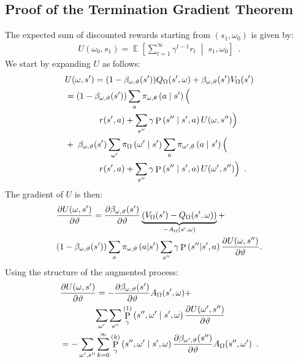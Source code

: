 \documentclass[letterpaper]{article}
\def\given{\;\middle\vert\;}
\DeclareMathOperator*{\expectation}{\mathbb{E}}
\DeclareMathOperator{\prob}{P}
\def\options{\Omega}
\def\option{\omega}
\def\termparams{\vartheta}
\begin{document}
\subsection*{Proof of the Termination Gradient Theorem}
The expected sum of discounted rewards starting from $(s_1, \omega_0)$ is given by:
\begin{align*}
U(\omega_0, s_1) = \expectation\left[ \sum_{t=1}^\infty \gamma^{t-1} r_{t}  \given s_1, \omega_0 \right] \enspace .
\end{align*}
We start by expanding $U$ as follows:
\begin{align}
&U( \option, s') = (1 - \beta_{\option, \termparams}(s'))Q_\Omega(s', \omega) + \beta_{\option, \termparams}(s')V_\Omega(s') \notag\\
&=(1 - \beta_{\option, \termparams}(s')) \sum_{a} \pi_{\option,\theta}\left(a \given s'\right) \Big(\notag \\
&\hspace{4em}r(s', a) + \sum_{s''} \gamma \prob\left(s'' \given s', a \right)U(\option, s'')\Big) \notag \\
&+ \;\beta_{\option, \termparams}(s') \sum_{\option'}\pi_{\Omega}\left( \option' \given s'\right)\sum_a \pi_{\option',\theta}\left(a \given s' \right)\Big( \notag \\
&\hspace{4em} r(s', a) + \sum_{s''} \gamma  \prob\left(s'' \given s', a\right) U(\option', s'')\Big)\notag \enspace .
\end{align}
The gradient of $U$ is then:
\begin{align*}
&\deriv[U(\option, s')]{\termparams} = \deriv[\beta_{\option, \termparams}(s')]{\termparams}\underbrace{\left(V_\options(s') - Q_\options(s', \option)\right)}_{-A_\options(s', \omega)} +\\
&(1 - \beta_{\option, \termparams}(s'))\sum_a \pi_{\option,\theta}\left(a | s'\right)\sum_{s''} \gamma \prob\left(s'' | s', a \right) \deriv[U(\option, s'')]{\termparams} .\notag\\
\end{align*}
Using the structure of the augmented process:
\begin{align*}
&\deriv[U(\option, s')]{\termparams} = -\deriv[\beta_{\option, \termparams}(s')]{\termparams} A_\options(s', \option) + \\
&\hspace{4em}\sum_{\option'} \sum_{s''} \prob_\gamma^{(1)}\left(s'', \option' \given s', \omega\right) \deriv[U(\option', s'')]{\termparams} \\
&=- \sum_{\option', s''} \sum_{k=0}^\infty \prob_\gamma^{(k)}\left(s'', \option' \given s',\omega \right) \deriv[\beta_{\option', \termparams}(s'')]{\termparams} A_\options(s'', \option') \enspace .
\end{align*}
\end{document}

